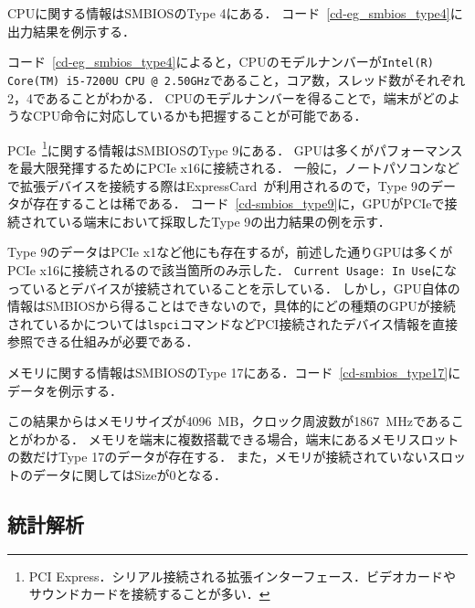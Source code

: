 CPUに関する情報はSMBIOSのType 4にある．
コード~\ref{cd-eg_smbios_type4}に出力結果を例示する．



コード~\ref{cd-eg_smbios_type4}によると，CPUのモデルナンバーが\texttt{Intel(R) Core(TM) i5-7200U CPU @ 2.50GHz}であること，コア数，スレッド数がそれぞれ2，4であることがわかる．
CPUのモデルナンバーを得ることで，端末がどのようなCPU命令に対応しているかも把握することが可能である．

PCIe~\footnote{PCI Express．シリアル接続される拡張インターフェース．ビデオカードやサウンドカードを接続することが多い．}に関する情報はSMBIOSのType 9にある．
GPUは多くがパフォーマンスを最大限発揮するためにPCIe x16に接続される．
一般に，ノートパソコンなどで拡張デバイスを接続する際はExpressCard~\cite{express_card}が利用されるので，Type 9のデータが存在することは稀である．
コード~\ref{cd-smbios_type9}に，GPUがPCIeで接続されている端末において採取したType 9の出力結果の例を示す．



Type 9のデータはPCIe x1など他にも存在するが，前述した通りGPUは多くがPCIe x16に接続されるので該当箇所のみ示した．
\texttt{Current Usage: In Use}になっているとデバイスが接続されていることを示している．
しかし，GPU自体の情報はSMBIOSから得ることはできないので，具体的にどの種類のGPUが接続されているかについては\texttt{lspci}コマンドなどPCI接続されたデバイス情報を直接参照できる仕組みが必要である．

メモリに関する情報はSMBIOSのType 17にある．コード~\ref{cd-smbios_type17}にデータを例示する．



この結果からはメモリサイズが4096~MB，クロック周波数が1867~MHzであることがわかる．
メモリを端末に複数搭載できる場合，端末にあるメモリスロットの数だけType 17のデータが存在する．
また，メモリが接続されていないスロットのデータに関してはSizeが0となる．
\subsection{統計解析}
